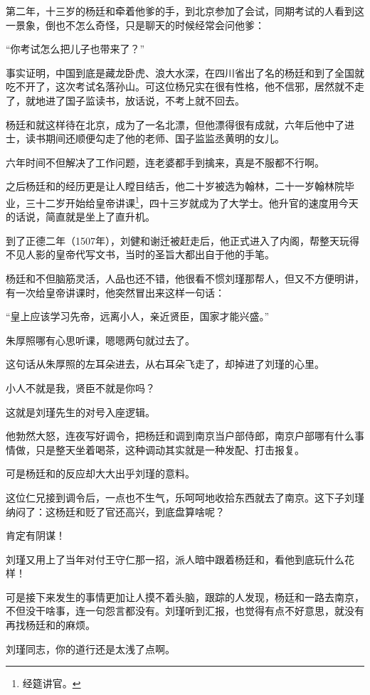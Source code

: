 \begin{multicols}{\theparacolNo}
		第二年，十三岁的杨廷和牵着他爹的手，到北京参加了会试，同期考试的人看到这一景象，倒也不怎么奇怪，只是聊天的时候经常会问他爹：

		“你考试怎么把儿子也带来了？”

		事实证明，中国到底是藏龙卧虎、浪大水深，在四川省出了名的杨廷和到了全国就吃不开了，这次考试名落孙山。可这位杨兄实在很有性格，他不信邪，居然就不走了，就地进了国子监读书，放话说，不考上就不回去。

		杨廷和就这样待在北京，成为了一名北漂，但他漂得很有成就，六年后他中了进士，读书期间还顺便勾走了他的老师、国子监监丞黄明的女儿。

		六年时间不但解决了工作问题，连老婆都手到擒来，真是不服都不行啊。

		之后杨廷和的经历更是让人瞠目结舌，他二十岁被选为翰林，二十一岁翰林院毕业，三十二岁开始给皇帝讲课\footnote{经筵讲官。}，四十三岁就成为了大学士。他升官的速度用今天的话说，简直就是坐上了直升机。

		到了正德二年（1507年），刘健和谢迁被赶走后，他正式进入了内阁，帮整天玩得不见人影的皇帝代写文书，当时的圣旨大都出自于他的手笔。

		杨廷和不但脑筋灵活，人品也还不错，他很看不惯刘瑾那帮人，但又不方便明讲，有一次给皇帝讲课时，他突然冒出来这样一句话：

		“皇上应该学习先帝，远离小人，亲近贤臣，国家才能兴盛。”

		朱厚照哪有心思听课，嗯嗯两句就过去了。

		这句话从朱厚照的左耳朵进去，从右耳朵飞走了，却掉进了刘瑾的心里。

		小人不就是我，贤臣不就是你吗？

		这就是刘瑾先生的对号入座逻辑。

		他勃然大怒，连夜写好调令，把杨廷和调到南京当户部侍郎，南京户部哪有什么事情做，只是整天坐着喝茶，这种调动其实就是一种发配、打击报复。

		可是杨廷和的反应却大大出乎刘瑾的意料。

		这位仁兄接到调令后，一点也不生气，乐呵呵地收拾东西就去了南京。这下子刘瑾纳闷了：这杨廷和贬了官还高兴，到底盘算啥呢？

		肯定有阴谋！

		刘瑾又用上了当年对付王守仁那一招，派人暗中跟着杨廷和，看他到底玩什么花样！

		可是接下来发生的事情更加让人摸不着头脑，跟踪的人发现，杨廷和一路去南京，不但没干啥事，连一句怨言都没有。刘瑾听到汇报，也觉得有点不好意思，就没有再找杨廷和的麻烦。

		刘瑾同志，你的道行还是太浅了点啊。


\end{multicols}
